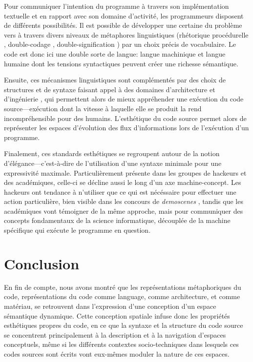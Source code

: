 \documentclass{article}
\begin{document}
Pour communiquer l'intention du programme à travers son implémentation textuelle et en rapport avec son domaine d'activité, les programmeurs disposent de différents possibilités. Il est possible de développer une certaine du problème vers à travers divers niveaux de métaphores linguistiques (rhétorique procédurelle \citep{bogost_rhetoric_2007}, double-codage \citep{cox_speaking_2013}, double-signification \citep{paloque-berges_poetique_2009}) par un choix précis de vocabulaire. Le code est donc ici une double sorte de langue: langue machinique et langue humaine dont les tensions syntactiques peuvent créer une richesse sémantique.

Ensuite, ces mécanismes linguistiques sont complémentés par des choix de structures et de syntaxe faisant appel à des domaines d'architecture et d'ingénierie \citep{gabriel_patterns_1998,schummer_aesthetic_2009}, qui permettent alors de mieux appréhender une exécution du code source—exécution dont la vitesse à laquelle elle se produit la rend incompréhensible pour des humains. L'esthétique du code source permet alors de représenter les espaces d'évolution des flux d'informations lors de l'exécution d'un programme.

Finalement, ces standards esthétiques se regroupent autour de la notion d'élégance—c'est-à-dire de l'utilisation d'une syntaxe minimale pour une expressivité maximale. Particulièrement présente dans les groupes de hackeurs et des académiques, celle-ci se décline aussi le long d'un axe machine-concept. Les hackeurs ont tendance à n'utiliser que ce qui est nécéssaire pour effectuer une action particulière, bien visible dans les concours de \emph{demoscenes} \citep{kudra_aoc_2020}, tandis que les académiques vont témoigner de la même approche, mais pour communiquer des concepts fondamentaux de la science informatique, découplée de la machine spécifique qui exécute le programme en question.


\section{Conclusion}

En fin de compte, nous avons montré que les représentations métaphoriques du code, représentations du code comme language, comme architecture, et comme matériau, se retrouvent dans l'expression d'une conception d'un espace sémantique dynamique. Cette conception spatiale infuse donc les propriétés esthétiques propres du code, en ce que la syntaxe et la structure du code source se concentrent principalement à la description et à la navigation d'espaces conceptuels, même si les différents contextes socio-techniques dans lesquels ces codes sources sont écrits vont eux-mêmes moduler la nature de ces espaces.

\pagebreak



\end{document}
